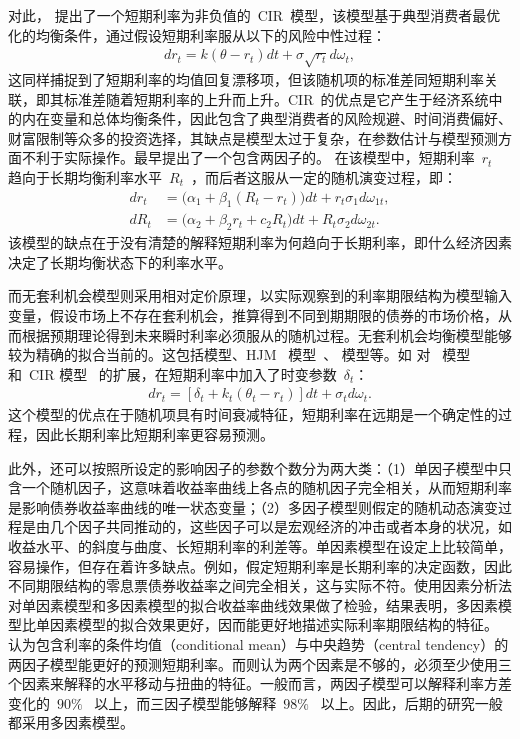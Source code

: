 对此， 提出了一个短期利率为非负值的~CIR~模型，该模型基于典型消费者最优化的均衡条件，通过假设短期利率服从以下的风险中性过程：
\begin{align}
  dr_t = k(\theta-r_t)dt + \sigma \sqrt{r_t} d \omega_t,
\end{align}
这同样捕捉到了短期利率的均值回复漂移项，但该随机项的标准差同短期利率关联，即其标准差随着短期利率的上升而上升。CIR~\tsm 的优点是它产生于经济系统中的内在变量和总体均衡条件，因此包含了典型消费者的风险规避、时间消费偏好、财富限制等众多的投资选择，其缺点是模型太过于复杂，在参数估计与模型预测方面不利于实际操作。最早提出了一个包含两因子的\tsm{}。 在该模型中，短期利率~$r_t$~ 趋向于长期均衡利率水平~$R_t$~，而后者这服从一定的随机演变过程，即：
\begin{align*}
  dr_t &= \big(\alpha_1+\beta_1(R_t-r_t)\big)dt + r_t \sigma_1 d \omega_{1t}, \\
  dR_t &= \big(\alpha_2+\beta_2r_t+c_2 R_t\big)dt + R_t \sigma_2 d \omega_{2t}.
\end{align*}
该模型的缺点在于没有清楚的解释短期利率为何趋向于长期利率，即什么经济因素决定了长期均衡状态下的利率水平。

而无套利机会模型则采用相对定价原理，以实际观察到的利率期限结构为模型输入变量，假设市场上不存在套利机会，推算得到不同到期期限的债券的市场价格，从而根据预期理论得到未来瞬时利率必须服从的随机过程。无套利机会均衡模型能够较为精确的拟合当前的\ts{}。这包括模型、HJM~ 模型~\cite{heath1992bond}、 模型等。如 对\citeauthor{vasicek1977equilibrium}~ 模型和~CIR 模型~\cite{cox1985theory} 的扩展，在短期利率中加入了时变参数~$\delta_t$：
\begin{align}
  dr_t = [\delta_t + k_t(\theta_t - r_t)] dt + \sigma_t d \omega_t.
\end{align}
这个模型的优点在于随机项具有时间衰减特征，短期利率在远期是一个确定性的过程，因此长期利率比短期利率更容易预测。

此外，\tsm 还可以按照所设定的影响因子的参数个数分为两大类：（1）单因子模型中只含一个随机因子，这意味着收益率曲线上各点的随机因子完全相关，从而短期利率是影响债券收益率曲线的唯一状态变量；（2）多因子模型则假定\ts 的随机动态演变过程是由几个因子共同推动的，这些因子可以是宏观经济的冲击或者\yc 本身的状况，如收益水平、\yc 的斜度与曲度、长短期利率的利差等。单因素模型在设定上比较简单，容易操作，但存在着许多缺点。例如，假定短期利率是长期利率的决定函数，因此不同期限结构的零息票债券收益率之间完全相关，这与实际不符。使用因素分析法对单因素模型和多因素模型的拟合收益率曲线效果做了检验，结果表明，多因素模型比单因素模型的拟合效果更好，因而能更好地描述实际利率期限结构的特征。 认为包含利率的条件均值（conditional mean）与中央趋势（central tendency）的两因子模型能更好的预测短期利率。而则认为两个因素是不够的，必须至少使用三个因素来解释\ts 的水平移动与扭曲的特征。一般而言，两因子模型可以解释利率方差变化的~$90\%$~ 以上，而三因子模型能够解释~$98\%$~ 以上。因此，后期的研究一般都采用多因素模型。


